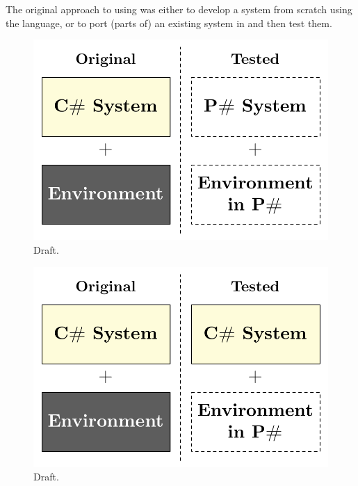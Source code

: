 The original approach to using \psharp was either to develop a system from scratch using the \psharp language, or to port (parts of) an existing system in \psharp and then test them.

\begin{figure}[t]
\centering
\includegraphics[width=\linewidth]{img/models_old}
\caption{Draft.}
\label{fig:oldapproach}
\end{figure}

\begin{figure}[t]
\centering
\includegraphics[width=\linewidth]{img/models_new}
\caption{Draft.}
\label{fig:newapproach}
\end{figure}

